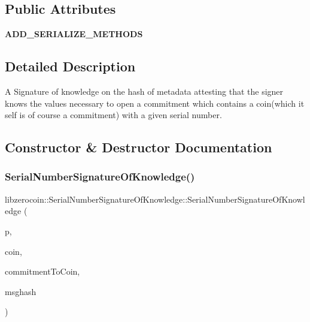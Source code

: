 \subsection*{Public Attributes}
\begin{DoxyCompactItemize}
\item 
\mbox{\label{classlibzerocoin_1_1_serial_number_signature_of_knowledge_a3ff30dcb83e75058b66e84cf1f9c671a}} 
{\bfseries A\+D\+D\+\_\+\+S\+E\+R\+I\+A\+L\+I\+Z\+E\+\_\+\+M\+E\+T\+H\+O\+DS}
\end{DoxyCompactItemize}


\subsection{Detailed Description}
A Signature of knowledge on the hash of metadata attesting that the signer knows the values necessary to open a commitment which contains a coin(which it self is of course a commitment) with a given serial number. 

\subsection{Constructor \& Destructor Documentation}
\mbox{\label{classlibzerocoin_1_1_serial_number_signature_of_knowledge_adb04da379098298cad6e05c930d6483f}} 
\subsubsection{\texorpdfstring{SerialNumberSignatureOfKnowledge()}{SerialNumberSignatureOfKnowledge()}}
{\footnotesize\ttfamily libzerocoin\+::\+Serial\+Number\+Signature\+Of\+Knowledge\+::\+Serial\+Number\+Signature\+Of\+Knowledge (\begin{DoxyParamCaption}\item[{const \mbox{\hyperlink{classlibzerocoin_1_1_zerocoin_params}{Zerocoin\+Params}} $\ast$}]{p,  }\item[{const \mbox{\hyperlink{classlibzerocoin_1_1_private_coin}{Private\+Coin}} \&}]{coin,  }\item[{const \mbox{\hyperlink{classlibzerocoin_1_1_commitment}{Commitment}} \&}]{commitment\+To\+Coin,  }\item[{\mbox{\hyperlink{classuint256}{uint256}}}]{msghash }\end{DoxyParamCaption})}

